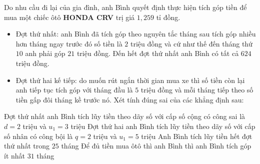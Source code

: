 	\begin{ex}%
	Do nhu cầu đi lại của gia đình, anh Bình quyết định thực hiện tích góp tiền để mua một chiếc ôtô \textbf{HONDA CRV} trị giá $1{,}259$ tỉ đồng.
	\begin{itemize}
		\item Đợt thứ nhất: anh Bình đã tích góp theo nguyên tắc tháng sau tích góp nhiều hơn tháng ngay trước đó số tiền là $2$ triệu đồng và cứ như thế đến tháng thứ $10$ anh phải góp $21$ triệu đồng. Đến hết đợt thứ nhất anh Bình có tất cả $624$ triệu đồng.				
		\item Đợt thứ hai kế tiếp: do muốn rút ngắn thời gian mua xe thì số tiền còn lại anh tiếp tục tích góp với tháng đầu là $5$ triệu đồng và mỗi tháng tiếp theo số tiền gấp đôi tháng kề trước nó. Xét tính đúng sai của các khẳng định sau:
	\end{itemize}
	\choiceTF
	{\True Đợt thứ nhất anh Bình tích lũy tiền theo dãy số với cấp số cộng có công sai là $d=2$ triệu và $u_1=3$ triệu}
	{\True Đợt thứ hai anh Bình tích lũy tiền theo dãy số với cấp số nhân có công bội là $q=2$ triệu và $u_1=5$ triệu}
	{Anh Bình tích lũy tiền hết đợt thứ nhất trong $25$ tháng}
	{\True Để đủ tiền mua ôtô thì anh Bình thì anh Bình tích góp ít nhất $31$ tháng}
	\end{ex}

